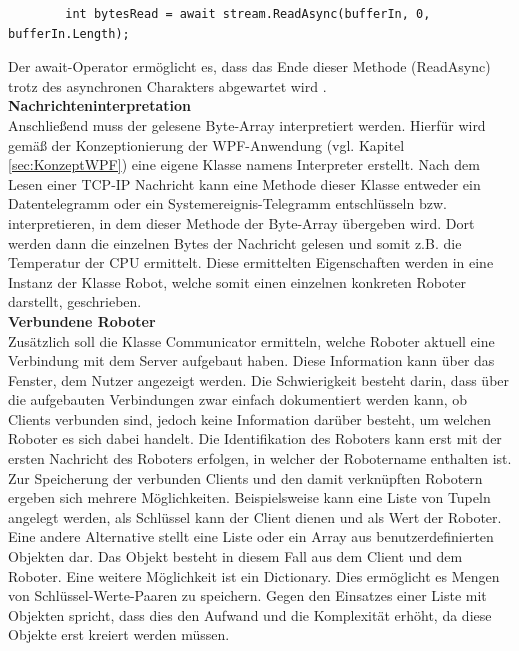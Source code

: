 \documentclass[ a4paper,
                oneside,
                toc=bibliography,
                toc=listof
                ]{scrbook}
\begin{document}
   	\begin{lstlisting}
   		int bytesRead = await stream.ReadAsync(bufferIn, 0, bufferIn.Length);
   	\end{lstlisting}
   	Der await-Operator ermöglicht es, dass das Ende dieser Methode (ReadAsync) trotz des asynchronen Charakters abgewartet wird \cite{kotz2022c}.\vspace{0.5\baselineskip}\\
   	\textbf{Nachrichteninterpretation} \\
    Anschließend muss der gelesene Byte-Array interpretiert werden. Hierfür wird gemäß der Konzeptionierung der WPF-Anwendung (vgl. Kapitel \ref{sec:KonzeptWPF}) eine eigene Klasse namens Interpreter erstellt. Nach dem Lesen einer TCP-IP Nachricht kann eine Methode dieser Klasse entweder ein Datentelegramm oder ein Systemereignis-Telegramm entschlüsseln bzw. interpretieren, in dem dieser Methode der Byte-Array übergeben wird. Dort werden dann die einzelnen Bytes der Nachricht gelesen und somit z.B. die Temperatur der CPU ermittelt. Diese ermittelten Eigenschaften werden in eine Instanz der Klasse Robot, welche somit einen einzelnen konkreten Roboter darstellt, geschrieben.\vspace{0.5\baselineskip}\\
    \textbf{Verbundene Roboter} \\
    Zusätzlich soll die Klasse Communicator ermitteln, welche Roboter aktuell eine Verbindung mit dem Server aufgebaut haben. Diese Information kann über das Fenster, dem Nutzer angezeigt werden. Die Schwierigkeit besteht darin, dass über die aufgebauten Verbindungen zwar einfach dokumentiert werden kann, ob Clients verbunden sind, jedoch keine Information darüber besteht, um welchen Roboter es sich dabei handelt. Die Identifikation des Roboters kann erst mit der ersten Nachricht des Roboters erfolgen, in welcher der Robotername enthalten ist. Zur Speicherung der verbunden Clients und den damit verknüpften Robotern ergeben sich mehrere Möglichkeiten. Beispielsweise kann eine Liste von Tupeln angelegt werden, als Schlüssel kann der Client dienen und als Wert der Roboter. Eine andere Alternative stellt eine Liste oder ein Array aus benutzerdefinierten Objekten dar. Das Objekt besteht in diesem Fall aus dem Client und dem Roboter. Eine weitere Möglichkeit ist ein Dictionary. Dies ermöglicht es Mengen von Schlüssel-Werte-Paaren zu speichern.
    Gegen den Einsatzes einer Liste mit Objekten spricht, dass dies den Aufwand und die Komplexität erhöht, da diese Objekte erst kreiert werden müssen.
\end{document}
